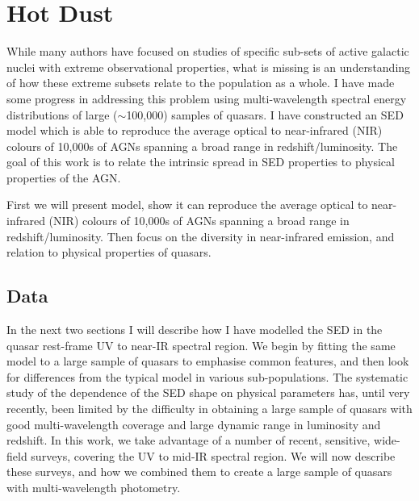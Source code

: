 \chapter{Hot Dust}\label{ch:hotdust} 





While many authors have focused on studies of specific sub-sets of active galactic nuclei with extreme observational properties, what is missing is an understanding of how these extreme subsets relate to the population as a whole. 
I have made some progress in addressing this problem using multi-wavelength spectral energy distributions of large ($\sim$100,000) samples of quasars. 
I have constructed an SED model which is able to reproduce the average optical to near-infrared (NIR) colours of 10,000s of AGNs spanning a broad range in redshift/luminosity. 
The goal of this work is to relate the intrinsic spread in SED properties to physical properties of the AGN. 

First we will present model, show it can reproduce the average optical to near-infrared (NIR) colours of 10,000s of AGNs spanning a broad range in redshift/luminosity. 
Then focus on the diversity in near-infrared emission, and relation to physical properties of quasars. 

\section{Data}

In the next two sections I will describe how I have modelled the SED in the quasar rest-frame UV to near-IR spectral region. 
We begin by fitting the same model to a large sample of quasars to emphasise common features, and then look for differences from the typical model in various sub-populations. 
The systematic study of the dependence of the SED shape on physical parameters has, until very recently, been limited by the difficulty in obtaining a large sample of quasars with good multi-wavelength coverage and large dynamic range in luminosity and redshift. 
In this work, we take advantage of a number of recent, sensitive, wide-field surveys, covering the UV to mid-IR spectral region. 
We will now describe these surveys, and how we combined them to create a large sample of quasars with multi-wavelength photometry.        

